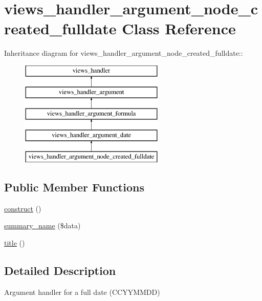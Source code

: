 \hypertarget{classviews__handler__argument__node__created__fulldate}{
\section{views\_\-handler\_\-argument\_\-node\_\-created\_\-fulldate Class Reference}
\label{classviews__handler__argument__node__created__fulldate}
}
Inheritance diagram for views\_\-handler\_\-argument\_\-node\_\-created\_\-fulldate::\begin{figure}[H]
\begin{center}
\leavevmode
\includegraphics[height=5cm]{classviews__handler__argument__node__created__fulldate}
\end{center}
\end{figure}
\subsection*{Public Member Functions}
\begin{DoxyCompactItemize}
\item 
\hyperlink{classviews__handler__argument__node__created__fulldate_af5b74c0204c9da9285cbe3e07ebed345}{construct} ()
\item 
\hyperlink{classviews__handler__argument__node__created__fulldate_ab3d201e95c5307b166a85add6cfdebe2}{summary\_\-name} (\$data)
\item 
\hyperlink{classviews__handler__argument__node__created__fulldate_a7e071511e9b2523b875b4ba983bbb8f2}{title} ()
\end{DoxyCompactItemize}


\subsection{Detailed Description}
Argument handler for a full date (CCYYMMDD) 

